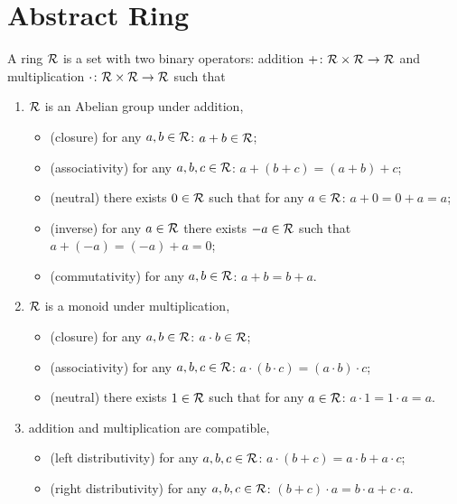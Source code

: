 \section{Abstract Ring}\label{app:ring}

\begin{definition}
    A ring $\mathcal{R}$ is a set with two binary operators: addition $+\colon
    \mathcal{R}\times\mathcal{R}\to\mathcal{R}$ and multiplication $\cdot\colon\mathcal{R}\times\mathcal{R}\to\mathcal{R}$ such that
    \begin{enumerate}
        \item $\mathcal{R}$ is an Abelian group under addition,
        \begin{itemize}
            \item (closure) for any $a,b \in \mathcal{R}$: $a+b\in\mathcal{R}$;
            \item (associativity) for any $a,b,c \in \mathcal{R}$: $a+(b+c) = (a+b)+c$;
            \item (neutral) there exists $0\in \mathcal{R}$ such that for any $a\in\mathcal{R}$:
            $a+0 = 0+a = a$;
            \item (inverse) for any $a\in\mathcal{R}$ there exists $-a \in\mathcal{R}$ such
            that $a+(-a)=(-a)+a = 0$;
            \item (commutativity) for any $a,b\in\mathcal{R}$: $a+b=b+a$.
        \end{itemize}
        \item $\mathcal{R}$ is a monoid under multiplication,
        \begin{itemize}
            \item (closure) for any $a,b \in \mathcal{R}$: $a\cdot b\in\mathcal{R}$;
            \item (associativity) for any $a,b,c \in \mathcal{R}$: $a\cdot(b\cdot c) =
            (a\cdot b)\cdot c$;
            \item (neutral) there exists $1\in \mathcal{R}$ such that for any $a\in\mathcal{R}$:
            $a\cdot 1 = 1\cdot a = a$.
        \end{itemize}
        \item addition and multiplication are compatible,
        \begin{itemize}
            \item (left distributivity) for any $a,b,c\in\mathcal{R}$: $a\cdot(b+c) = a\cdot
            b+a\cdot c$;
            \item (right distributivity) for any $a,b,c\in\mathcal{R}$: $(b+c)\cdot a =
            b\cdot a + c\cdot a$.
        \end{itemize}
    \end{enumerate}
\end{definition}

